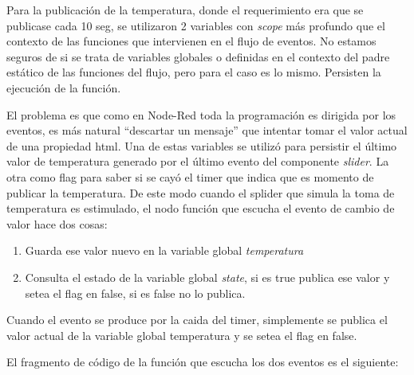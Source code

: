 \documentclass[11pt]{extarticle}
\begin{document}
Para la publicación de la temperatura, donde el requerimiento era que se
publicase cada 10 seg, se utilizaron 2 variables con \emph{scope} más
profundo que el contexto de las funciones que intervienen en el flujo de
eventos. No estamos seguros de si se trata de variables globales o
definidas en el contexto del padre estático de las funciones del flujo,
pero para el caso es lo mismo. Persisten la ejecución de la función.

El problema es que como en Node-Red toda la programación es dirigida por
los eventos, es más natural ``descartar un mensaje'' que intentar tomar
el valor actual de una propiedad html. Una de estas variables se utilizó
para persistir el último valor de temperatura generado por el último
evento del componente \emph{slider}. La otra como flag para saber si se
cayó el timer que indica que es momento de publicar la temperatura. De
este modo cuando el splider que simula la toma de temperatura es
estimulado, el nodo función que escucha el evento de cambio de valor
hace dos cosas:

\begin{enumerate}
\def\labelenumi{\arabic{enumi})}
\item
  Guarda ese valor nuevo en la variable global \emph{temperatura}
\item
  Consulta el estado de la variable global \emph{state}, si es true
  publica ese valor y setea el flag en false, si es false no lo publica.
\end{enumerate}

Cuando el evento se produce por la caida del timer, simplemente se
publica el valor actual de la variable global temperatura y se setea el
flag en false.

El fragmento de código de la función que escucha los dos eventos es el
siguiente:
\end{document}
